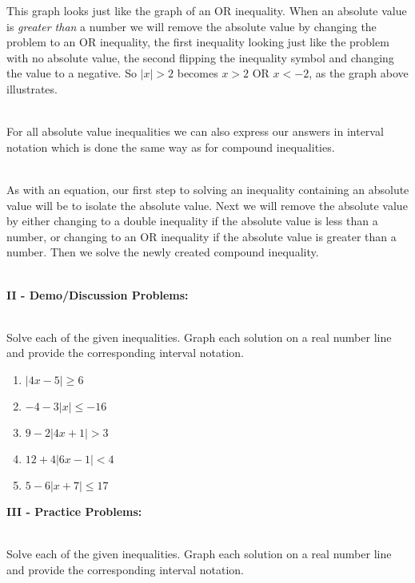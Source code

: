 \documentclass[12pt]{article}
\theoremstyle{definition}
\begin{document}
This graph looks just like the graph of an OR inequality.  When an absolute value is {\it greater than} a number we will remove the
absolute value by changing the problem to an OR inequality, the first inequality looking just like the problem with no absolute value, the second
flipping the inequality symbol and changing the value to a negative. So $|x| >
2$ becomes $x > 2$ OR $x < - 2$, as the graph above illustrates.\\
\ \par
For all absolute value inequalities we can also express our answers in interval notation which is done the same way as for compound
inequalities.\\
\ \par
As with an equation, our first step to solving an inequality containing an absolute value will be to isolate the absolute value. Next we will
remove the absolute value by either changing to a double inequality if the absolute value is less than a number, or changing to an OR inequality if the absolute value is greater than a number. Then we solve the newly created compound inequality.\\
\ \par
{\bf II - Demo/Discussion Problems:}\\
\ \par
Solve each of the given inequalities. Graph each solution on a real number line and provide the corresponding interval notation.
\begin{enumerate}
	\item $|4x - 5| \geq 6$
	\item $- 4 - 3 |x| \leq - 16$
	\item $9 - 2 |4x + 1| > 3$
	\item $12 + 4 |6x - 1| < 4$
	\item $5 - 6 |x + 7| \leq 17$
\end{enumerate}
\newpage
{\bf III - Practice Problems:}\\
\ \par
Solve each of the given inequalities. Graph each solution on a real number line and provide the corresponding interval notation.
\end{document}
